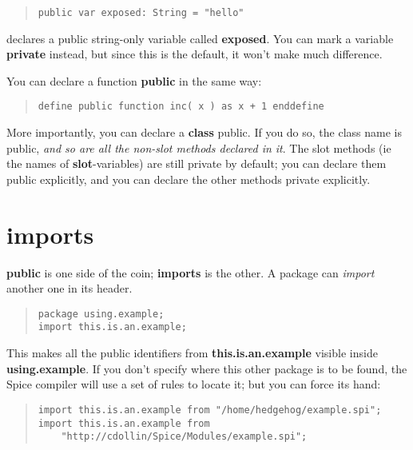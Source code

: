 \documentclass{report}
\begin{document}
\begin{quote}
\begin{verbatim}
public var exposed: String = "hello"
\end{verbatim}
\end{quote}


declares a public string-only variable called {\bf exposed}. You can mark a
variable {\bf private} instead, but since this is the default, it won't make much
difference.

You can declare a function {\bf public} in the same way:

\begin{quote}
\begin{verbatim}
define public function inc( x ) as x + 1 enddefine
\end{verbatim}
\end{quote}


More importantly, you can declare a {\bf class} public. If you do so, the
class name is public, {\em and so are all the non-slot methods declared in
it}. The slot methods (ie the names of {\bf slot}-variables) are still private by
default; you can declare them public explicitly, and you can declare the other
methods private explicitly.

\section{imports}


{\bf public} is one side of the coin; {\bf imports} is the other. A package can
{\em import} another one in its header.

\begin{quote}
\begin{verbatim}
package using.example;
import this.is.an.example;
\end{verbatim}
\end{quote}


This makes all the public identifiers from {\bf this.is.an.example} visible inside
{\bf using.example}. If you don't specify where this other package is to be found,
the Spice compiler will use a set of rules to locate it; but you can force its
hand:

\begin{quote}
\begin{verbatim}
import this.is.an.example from "/home/hedgehog/example.spi";
import this.is.an.example from
    "http://cdollin/Spice/Modules/example.spi";
\end{verbatim}
\end{quote}
\end{document}
